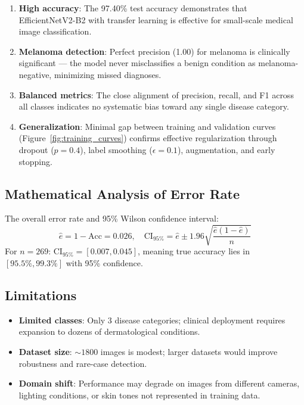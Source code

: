 \documentclass[10pt,a4paper,twocolumn]{article}
\begin{document}
\begin{enumerate}
\item \textbf{High accuracy}: The 97.40\% test accuracy demonstrates that EfficientNetV2-B2 with transfer learning is effective for small-scale medical image classification.
\item \textbf{Melanoma detection}: Perfect precision (1.00) for melanoma is clinically significant --- the model never misclassifies a benign condition as melanoma-negative, minimizing missed diagnoses.
\item \textbf{Balanced metrics}: The close alignment of precision, recall, and F1 across all classes indicates no systematic bias toward any single disease category.
\item \textbf{Generalization}: Minimal gap between training and validation curves (Figure~\ref{fig:training_curves}) confirms effective regularization through dropout ($p=0.4$), label smoothing ($\epsilon=0.1$), augmentation, and early stopping.
\end{enumerate}

\subsection{Mathematical Analysis of Error Rate}

The overall error rate and 95\% Wilson confidence interval:
\begin{equation}
\hat{e} = 1 - \text{Acc} = 0.026, \quad \text{CI}_{95\%} = \hat{e} \pm 1.96\sqrt{\frac{\hat{e}(1-\hat{e})}{n}}
\end{equation}
For $n=269$: $\text{CI}_{95\%} = [0.007, 0.045]$, meaning true accuracy lies in $[95.5\%, 99.3\%]$ with 95\% confidence.

\subsection{Limitations}

\begin{itemize}
\item \textbf{Limited classes}: Only 3 disease categories; clinical deployment requires expansion to dozens of dermatological conditions.
\item \textbf{Dataset size}: ${\sim}1800$ images is modest; larger datasets would improve robustness and rare-case detection.
\item \textbf{Domain shift}: Performance may degrade on images from different cameras, lighting conditions, or skin tones not represented in training data.
\end{itemize}
\end{document}
